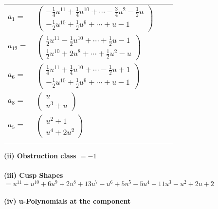 \documentclass[1p]{elsarticle_modified}
\theoremstyle{definition}
\begin{document}
\begin{tabular}{m{7pt} m{180pt} m{7pt} m{180pt} }
\flushright $a_{1}=$&$\begin{pmatrix}-\frac{1}{4} u^{11}+\frac{1}{4} u^{10}+\cdots-\frac{3}{4} u^2-\frac{1}{2} u\\-\frac{1}{2} u^{10}+\frac{1}{2} u^9+\cdots+u-1\end{pmatrix}$ \\
\flushright $a_{12}=$&$\begin{pmatrix}\frac{1}{2} u^{11}-\frac{1}{2} u^{10}+\cdots+\frac{1}{2} u-1\\\frac{1}{2} u^{10}+2 u^8+\cdots+\frac{1}{2} u^2- u\end{pmatrix}$ \\
\flushright $a_{6}=$&$\begin{pmatrix}\frac{1}{4} u^{11}+\frac{1}{4} u^{10}+\cdots-\frac{1}{2} u+1\\-\frac{1}{2} u^{10}+\frac{1}{2} u^9+\cdots+u-1\end{pmatrix}$ \\
\flushright $a_{8}=$&$\begin{pmatrix}u\\u^3+u\end{pmatrix}$ \\
\flushright $a_{5}=$&$\begin{pmatrix}u^2+1\\u^4+2 u^2\end{pmatrix}$\\&\end{tabular}
\flushleft \textbf{(ii) Obstruction class $= -1$}\\~\\
\flushleft \textbf{(iii) Cusp Shapes $= u^{11}+u^{10}+6 u^9+2 u^8+13 u^7- u^6+5 u^5-5 u^4-11 u^3- u^2+2 u+2$}\\~\\
\newpage\renewcommand{\arraystretch}{1}
\flushleft \textbf{(iv) u-Polynomials at the component}\newline \\
\end{document}
